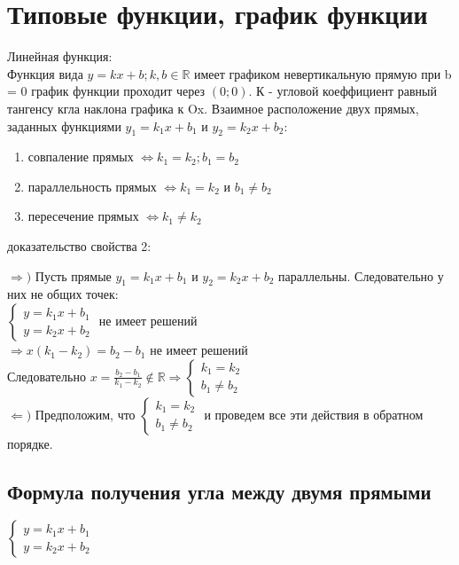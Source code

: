 \documentclass[oneside]{book}
\begin{document}
\section[Графики]{Типовые функции, график функции}
Линейная функция:\\
Функция вида $y = kx + b; k, b \in \mathbb{R}$ имеет графиком невертикальную прямую при b = 0 график функции проходит через $(0; 0)$.
К - угловой коеффициент равный тангенсу кгла наклона графика к Ox. Взаимное расположение двух прямых, заданных функциями
$y_1 = k_1x + b_1$ и $y_2 = k_2x + b_2$:
\begin{enumerate}
    \item совпаление прямых $\Leftrightarrow k_1 = k_2; b_1 = b_2$
    \item параллельность прямых $\Leftrightarrow k_1 = k_2 \textbf{ и } b_1 \neq b_2$
    \item пересечение прямых $\Leftrightarrow k_1 \neq k_2$
\end{enumerate}

доказательство свойства 2:
\begin{center}
    $\Rightarrow )$ Пусть прямые $y_1 = k_1x + b_1$ и $y_2 = k_2x + b_2$ параллельны. Следовательно у них не общих точек:\\
    $\begin{cases}
        y = k_1x + b_1 \\
        y = k_2x + b_2
    \end{cases}$ не имеет решений \\ $\Rightarrow x(k_1 - k_2) = b_2 - b_1$ не имеет решений\\
    Следовательно $x = \frac{b_2-b_1}{k_1-k_2} \notin \mathbb{R} \Rightarrow \begin{cases}
        k_1 = k_2 \\ b_1 \neq b_2
    \end{cases}$\\
    $\Leftarrow)$ Предположим, что $\begin{cases} k_1 = k_2 \\ b_1 \neq b_2 \end{cases}$ и проведем все эти действия в обратном порядке.
\end{center}

\subsection[угол между прямыми]{Формула получения угла между двумя прямыми}

$\begin{cases}
    y = k_1x + b_1 \\
    y = k_2x + b_2
\end{cases}$
\end{document}
